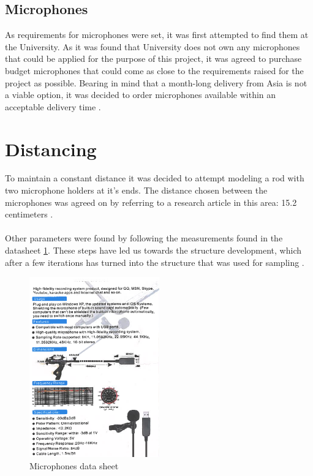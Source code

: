 \subsection{Microphones}
As requirements for microphones were set, it was first attempted to find them at the University. As it was found that University does not own any microphones that could be applied for the purpose of this project, it was agreed to purchase budget microphones that could come as close to the requirements raised for the project as possible. Bearing in mind that a month-long delivery from Asia is not a viable option, it was decided to order microphones available within an acceptable delivery time .\\

\section{Distancing}
To maintain a constant distance it was decided to attempt modeling a rod with two microphone holders at it's ends. The distance chosen between the microphones was agreed on by referring to a research article in this area: 15.2 centimeters . 
\paragraph{}
Other parameters were found by following the measurements found in the datasheet \ref{fig:MicData}. These steps have led us towards the structure development, which after a few iterations has turned into the structure that was used for sampling .
\begin{figure} [htp] 
  \centering
    \includegraphics[width=0.5\textwidth]{Illustrations/MicData}
    \caption{Microphones data sheet}
    \label{fig:MicData}
\end{figure}

